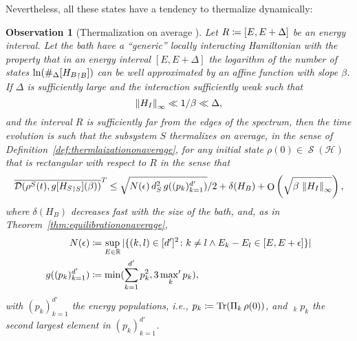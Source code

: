 \documentclass[a4paper,12pt,listof=totoc,index=totoc,bibliography=totoc,headsepline=false,headings=normal,BCOR16.153846mm,DIV12,headinclude,twoside,cleardoublepage=empty,numbers=noenddot,final]{scrreprt}
\theoremstyle{mystyle}
\numberwithin{equation}{section}
\numberwithin{figure}{section}
\numberwithin{lemma}{section}
\numberwithin{theorem}{section}
\numberwithin{corollary}{section}
\numberwithin{definition}{section}
\numberwithin{conjecture}{section}
\newtheorem{observation}{Observation}
\numberwithin{observation}{section}
\newcommand{\+}{\mkern2mu}
\newcommand{\coloneqq}{\mathrel{\vcentcolon\mkern-1.2mu=}} %
\newcommand{\suchthat}{\colon}
\renewcommand{\min}{\mathchoice{\operatorname*{min}}{\operatorname*{min}}{\mathrm{min}}{\mathrm{min}}}
\renewcommand{\H}{H}
\newcommand{\rhog}{g}
\newcommand{\norm}[2][]{
  \ifthenelse{\equal{#1}{}}
    {\left\| {#2} \right\|}
    {\ifthenelse{\equal{#1}{uinv}}
      {\left\vert\kern-0.25ex\left\vert\kern-0.25ex\left\vert {#2} \right\vert\kern-0.25ex\right\vert\kern-0.25ex\right\vert}
      {\left\| {#2} \right\|_{#1}}
    }
}
\newcommand{\taverage}[2][]{
  \ifthenelse{\equal{#1}{}}
  {\overline{#2}}
  {\overline{#2}^{#1}}
}
\newcommand{\tracedistance}[3][]{
  \ifthenelse{\equal{#2}{}}
  {\ifthenelse{\equal{#3}{}}
    {\mathcal{D}_{#1}}{}
  }{
    \ifthenelse{\equal{#1}{}}
    {\operatorname{\mathcal{D}}(#2,#3)}
    {\operatorname{\mathcal{D}}_{#1}(#2,#3)}
  }
}
\DeclareMathOperator{\landauO}{O}
\DeclareMathOperator*{\maxprime}{\mathrm{max}^\prime}
\newcommand{\trunc}[2]{{#1}_{\upharpoonright \mathnormal{#2}}}
\DeclareMathOperator{\1}{\mathds{1}}
\DeclareMathOperator{\Qst}{\mathcal{S}}
\DeclareMathOperator{\Tr}{Tr}
\newcommand{\mc}[1]{\mathcal{#1}}
\newcommand{\mcH}{\mc{H}}
\newcommand{\mb}[1]{\mathbb{#1}}
\newcommand{\R}{\mb{R}}
\begin{document}
Nevertheless, all these states have a tendency to thermalize dynamically:
\begin{observation}[Thermalization on average \cite{Riera2012}] \label{obs:thermalizationonaverage}
  Let $R \coloneqq [E,E+\Delta]$ be an energy interval.
  Let the bath have a ``generic'' locally interacting Hamiltonian with the property that in an energy interval $[E,E+\Delta]$ the logarithm of the number of states $\ln(\#_\Delta[\trunc{\H_B}B])$ can be well approximated by an affine function with slope $\beta$.
  If $\Delta$ is sufficiently large and the interaction sufficiently weak such that
  \begin{equation}
    \norm[\infty]{\H_I} \ll 1/\beta \ll \Delta ,
  \end{equation}
  and the interval $R$ is sufficiently far from the edges of the spectrum, then the time evolution is such that the subsystem $S$ thermalizes on average, in the sense of Definition~\ref{def:thermlaizationonaverage}, for any initial state $\rho(0) \in \Qst(\mcH)$ that is rectangular with respect to $R$ in the sense that
  \begin{equation}
    \taverage[T]{\tracedistance{\rho^S(t)}{\rhog[\trunc{\H_S}S](\beta)}} \leq \sqrt{N(\epsilon)\,d_S^2\,g((p_k)_{k=1}^{d'}) }/2 + \delta(\H_B) + \landauO\left(\sqrt{\beta\,\norm[\infty]{H_I}}\right) ,
  \end{equation}
  where $\delta(\H_B)$ decreases fast with the size of the bath, and, as in Theorem~\ref{thm:equilibrationonaverage},
  \begin{align}
    N(\epsilon) &\coloneqq \sup_{E \in \R} |\{(k,l) \in [d']^2\suchthat k\neq l \land E_k - E_l \in [E,E+\epsilon] \}| \\
    g((p_k)_{k=1}^{d'}) &\coloneqq \min(\sum_{k=1}^{d'} p_k^2, 3  \maxprime_k p_k ) ,
  \end{align}
  with $(p_k)_{k=1}^{d'}$ the energy populations, i.e., $p_k \coloneqq \Tr(\Pi_k\,\rho(0))$, and $\maxprime_k p_k$ the second largest element in $(p_k)_{k=1}^{d'}$.
\end{observation}
\end{document}
